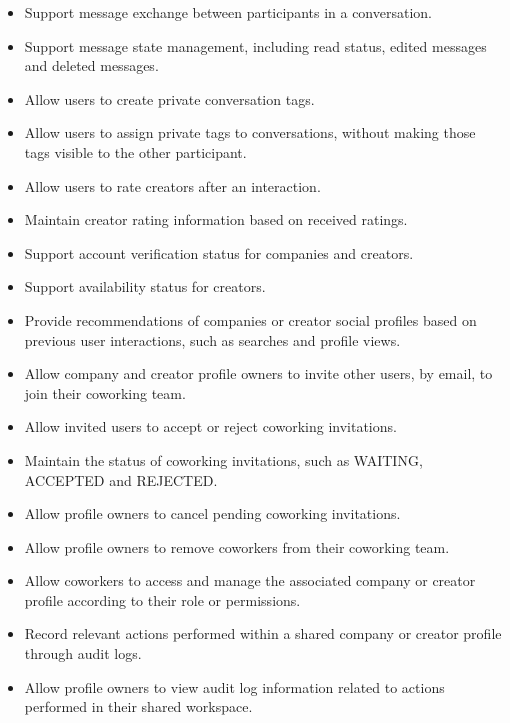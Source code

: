 \begin{itemize}
    \item Support message exchange between participants in a conversation.
    
    \item Support message state management, including read status, edited messages and deleted messages.
    
    \item Allow users to create private conversation tags.
    
    \item Allow users to assign private tags to conversations, without making those tags visible to the other participant.

    \item Allow users to rate creators after an interaction.

    \item Maintain creator rating information based on received ratings.

    \item Support account verification status for companies and creators.

    \item Support availability status for creators.

    \item Provide recommendations of companies or creator social profiles based on previous user interactions, such as searches and profile views.

    \item Allow company and creator profile owners to invite other users, by email, to join their coworking team. 
    
    \item Allow invited users to accept or reject coworking invitations. 
    
    \item Maintain the status of coworking invitations, such as WAITING, ACCEPTED and REJECTED. 
    
    \item Allow profile owners to cancel pending coworking invitations. 
    
    \item Allow profile owners to remove coworkers from their coworking team. 
    
    \item Allow coworkers to access and manage the associated company or creator profile according to their role or permissions. 
    
    \item Record relevant actions performed within a shared company or creator profile through audit logs. 
    
    \item Allow profile owners to view audit log information related to actions performed in their shared workspace.
\end{itemize}

